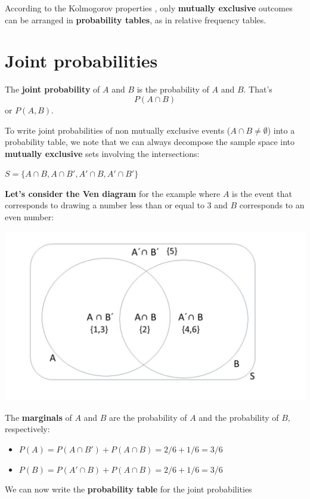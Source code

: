 \documentclass[
]{book}
\providecommand{\tightlist}{%
  \setlength{\itemsep}{0pt}\setlength{\parskip}{0pt}}
\begin{document}
According to the Kolmogorov properties , only \textbf{mutually exclusive} outcomes can be arranged in \textbf{probability tables}, as in relative frequency tables.

\hypertarget{joint-probabilities}{%
\section{Joint probabilities}\label{joint-probabilities}}

The \textbf{joint probability} of \(A\) and \(B\) is the probability of \(A\) and \(B\). That's \[P( A \cap B)\] or \(P(A,B)\).

To write joint probabilities of non mutually exclusive events (\(A \cap B \neq \emptyset\)) into a probability table, we note that we can always decompose the sample space into \textbf{mutually exclusive} sets involving the intersections:

\(S=\{A\cap B, A \cap B', A'\cap B, A'\cap B'\}\)

\textbf{Let's consider the Ven diagram} for the example where \(A\) is the event that corresponds to drawing a number less than or equal to 3 and \(B\) corresponds to an even number:

\includegraphics{./figures/Venn.JPG}

The \textbf{marginals} of \(A\) and \(B\) are the probability of \(A\) and the probability of \(B\), respectively:

\begin{itemize}
\tightlist
\item
  \(P(A)=P(A\cap B') + P(A \cap B)=2/6+1/6=3/6\)
\item
  \(P(B)=P(A'\cap B) +P(A \cap B)=2/6+1/6=3/6\)
\end{itemize}

We can now write the \textbf{probability table} for the joint probabilities
\end{document}
